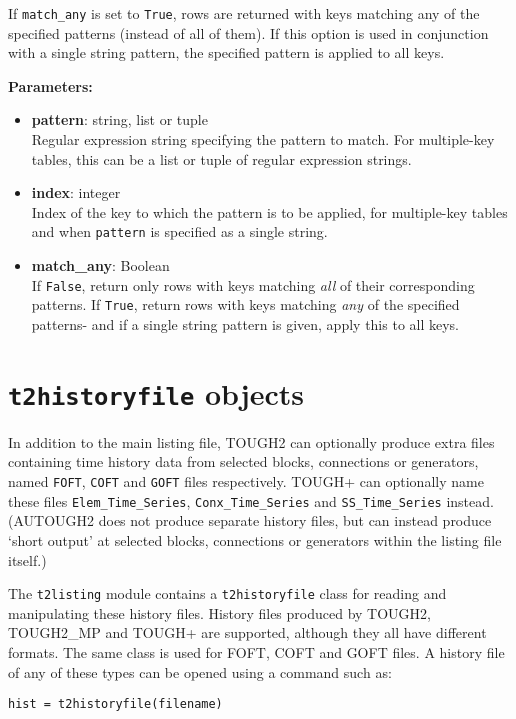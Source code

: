 If \texttt{match\_any} is set to \texttt{True}, rows are returned with keys matching any of the specified patterns (instead of all of them).  If this option is used in conjunction with a single string pattern, the specified pattern is applied to all keys.

\textbf{Parameters:}
\begin{itemize}
\item \textbf{pattern}: string, list or tuple\\
  Regular expression string specifying the pattern to match.  For multiple-key tables, this can be a list or tuple of regular expression strings.
\item \textbf{index}: integer\\
  Index of the key to which the pattern is to be applied, for multiple-key tables and when \texttt{pattern} is specified as a single string.
\item \textbf{match\_any}: Boolean\\
  If \texttt{False}, return only rows with keys matching \emph{all} of their corresponding patterns.  If \texttt{True}, return rows with keys matching \emph{any} of the specified patterns- and if a single string pattern is given, apply this to all keys.
\end{itemize}

\section{\texttt{t2historyfile} objects}

In addition to the main listing file, TOUGH2 can optionally produce extra files containing time history data from selected blocks, connections or generators, named \texttt{FOFT}, \texttt{COFT} and \texttt{GOFT} files respectively.  TOUGH+ can optionally name these files \texttt{Elem\_Time\_Series}, \texttt{Conx\_Time\_Series} and \texttt{SS\_Time\_Series} instead.  (AUTOUGH2 does not produce separate history files, but can instead produce `short output' at selected blocks, connections or generators within the listing file itself.)

The \texttt{t2listing} module contains a \texttt{t2historyfile} class for reading and manipulating these history files.  History files produced by TOUGH2, TOUGH2\_MP and TOUGH+ are supported, although they all have different formats.  The same class is used for FOFT, COFT and GOFT files.  A history file of any of these types can be opened using a command such as:

\begin{verbatim}
hist = t2historyfile(filename)
\end{verbatim}

